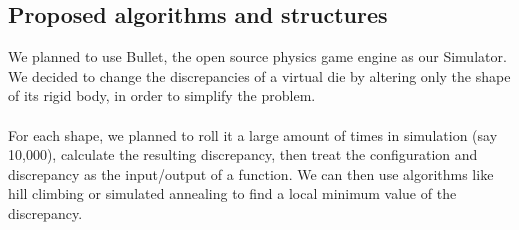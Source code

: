 \subsection{Proposed algorithms and structures}
We planned to use Bullet\cite{Bullet}, the open source physics game engine as our Simulator. We decided to change the discrepancies of a virtual die by altering only the shape of its rigid body, in order to simplify the problem.\\\\
For each shape, we planned to roll it a large amount of times in simulation (say 10,000), calculate the resulting discrepancy, then treat the configuration and discrepancy as the input/output of a function. We can then use algorithms like hill climbing or simulated annealing to find a local minimum value of the discrepancy.